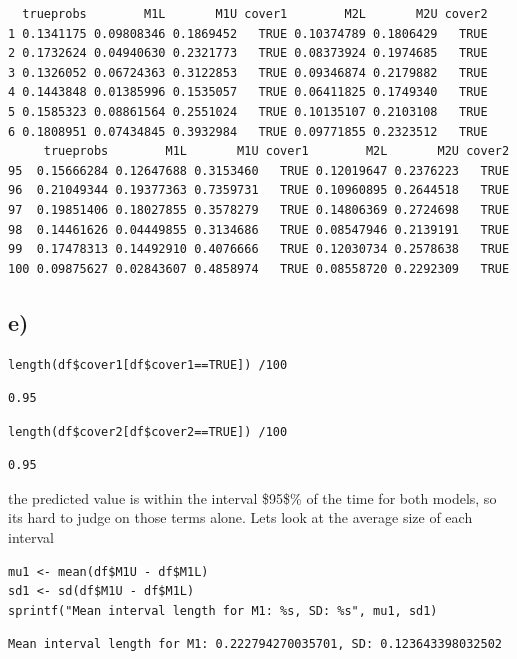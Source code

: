 \documentclass[11pt]{article}
\begin{document}
\begin{verbatim}
  trueprobs        M1L       M1U cover1        M2L       M2U cover2
1 0.1341175 0.09808346 0.1869452   TRUE 0.10374789 0.1806429   TRUE
2 0.1732624 0.04940630 0.2321773   TRUE 0.08373924 0.1974685   TRUE
3 0.1326052 0.06724363 0.3122853   TRUE 0.09346874 0.2179882   TRUE
4 0.1443848 0.01385996 0.1535057   TRUE 0.06411825 0.1749340   TRUE
5 0.1585323 0.08861564 0.2551024   TRUE 0.10135107 0.2103108   TRUE
6 0.1808951 0.07434845 0.3932984   TRUE 0.09771855 0.2323512   TRUE
     trueprobs        M1L       M1U cover1        M2L       M2U cover2
95  0.15666284 0.12647688 0.3153460   TRUE 0.12019647 0.2376223   TRUE
96  0.21049344 0.19377363 0.7359731   TRUE 0.10960895 0.2644518   TRUE
97  0.19851406 0.18027855 0.3578279   TRUE 0.14806369 0.2724698   TRUE
98  0.14461626 0.04449855 0.3134686   TRUE 0.08547946 0.2139191   TRUE
99  0.17478313 0.14492910 0.4076666   TRUE 0.12030734 0.2578638   TRUE
100 0.09875627 0.02843607 0.4858974   TRUE 0.08558720 0.2292309   TRUE
\end{verbatim}

\subsection*{e)}
\label{sec:org3d49af7}

\begin{verbatim}
length(df$cover1[df$cover1==TRUE]) /100
\end{verbatim}

\begin{verbatim}
0.95
\end{verbatim}


\begin{verbatim}
length(df$cover2[df$cover2==TRUE]) /100
\end{verbatim}

\begin{verbatim}
0.95
\end{verbatim}

the predicted value is within the interval \$95\$\% of the time for both models, so its hard to judge on those terms alone. Lets look at the average size of each interval

\begin{verbatim}
mu1 <- mean(df$M1U - df$M1L)
sd1 <- sd(df$M1U - df$M1L)
sprintf("Mean interval length for M1: %s, SD: %s", mu1, sd1)
\end{verbatim}

\begin{verbatim}
Mean interval length for M1: 0.222794270035701, SD: 0.123643398032502
\end{verbatim}
\end{document}
